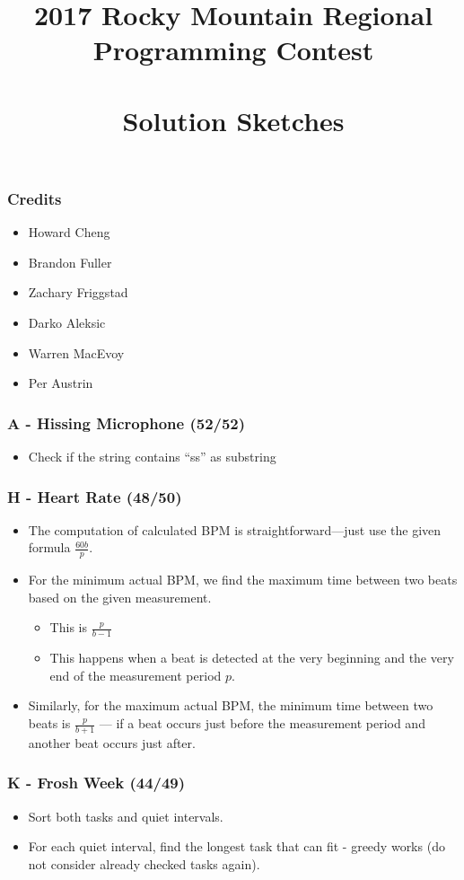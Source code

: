 \documentclass{beamer}
\title[RMRC 2017 Solution Sketches]
{2017 Rocky Mountain Regional \\ Programming Contest \\ \ \\ Solution Sketches}
\date
{}
\begin{document}
\begin{frame}
\titlepage
\end{frame}
\begin{frame}
\frametitle{Credits}
\begin{itemize}
\setlength\itemsep{0.5\baselineskip}
\item Howard Cheng
\item Brandon Fuller
\item Zachary Friggstad
\item Darko Aleksic
\item Warren MacEvoy
\item Per Austrin
\end{itemize}
\end{frame}

\begin{frame}
\frametitle{A - Hissing Microphone (52/52)}
\begin{itemize}
\setlength\itemsep{0.5\baselineskip}
\item Check if the string contains ``ss'' as substring
\end{itemize}
\end{frame}


\begin{frame}
\frametitle{H - Heart Rate (48/50)}
\begin{itemize}
\setlength\itemsep{0.5\baselineskip}
\item The computation of calculated BPM is straightforward---just use the given formula $\frac{60b}{p}$.
\item For the minimum actual BPM, we find the maximum time between two
  beats based on the given measurement.
  \begin{itemize}
  \item This is $\frac{p}{b-1}$
  \item This happens when a beat is detected at the very beginning and
    the very end of the measurement period $p$.
  \end{itemize}
\item Similarly, for the maximum actual BPM, the minimum time between
  two beats is $\frac{p}{b+1}$ --- if a beat occurs just before the
  measurement period and another beat occurs just after.
\end{itemize}
\end{frame}


\begin{frame}
\frametitle{K - Frosh Week (44/49)}
\begin{itemize}
\setlength\itemsep{0.5\baselineskip}
\item Sort both tasks and quiet intervals.
\item For each quiet interval, find the longest task that can fit - greedy works (do not consider already checked tasks again).
\end{itemize}
\end{frame}
\end{document}
